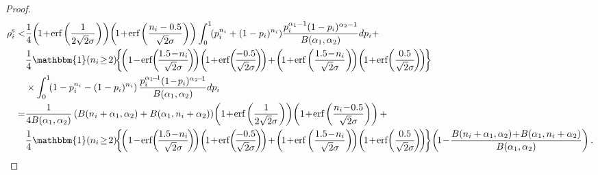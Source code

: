 \documentclass[10pt,journal,compsoc]{IEEEtran}
\begin{document}
\begin{proof}
\begin{align*}
\rho^{\text{s}}_i<&\frac{1}{4}\!\left(\!1\!+\!\mbox{erf}\left(\frac{1}{2\sqrt{2}\sigma}\right)\right)\!\left(\!1\!+\!\mbox{erf}\left(\frac{n_i-0.5}{\sqrt{2}\sigma}\right)\right)\int_{0}^{1}\!\!\left(p_i^{n_i}+(1-p_i)^{n_i}\right)\!\frac{p_i^{\alpha_1-1}(1-p_i)^{\alpha_2-1}}{B(\alpha_1,\alpha_2)}dp_i+\\
&\frac{1}{4}\mathbbm{1}(n_i\!\ge\!2)\!\bigg\{\!\!\left(1\!-\!\mbox{erf}\!\left(\!\frac{1.5\!-\!n_i}{\sqrt{2}\sigma}\!\right)\!\right)\!\left(\!1\!+\!\mbox{erf}\!\left(\!\frac{-0.5}{\sqrt{2}\sigma}\!\right)\!\right)\!+\!\left(\!1\!+\!\mbox{erf}\left(\frac{1.5\!-\!n_i}{\sqrt{2}\sigma}\right)\!\right)\!\left(\!1\!+\!\mbox{erf}\!\left(\frac{0.5}{\sqrt{2}\sigma}\!\right)\!\right)\!\!\bigg\}\\
&\times\int_0^1\!\!\left(1-p_i^{n_i}-(1-p_i)^{n_i}\right)\frac{p_i^{\alpha_1\!-\!1}(1\!-\!p_i)^{\alpha_2\!-\!1}}{B(\alpha_1,\alpha_2)}dp_i\!\\
=&\frac{1}{4B(\alpha_1,\alpha_2)}\left(B(n_i+\alpha_1,\alpha_2)+B(\alpha_1,n_i+\alpha_2)\right)\!\left(1\!+\!\mbox{erf}\left(\frac{1}{2\sqrt{2}\sigma}\right)\right)\!\left(1\!+\!\mbox{erf}\left(\frac{n_i\!-\!0.5}{\sqrt{2}\sigma}\right)\right)+\\
&\frac{1}{4}\mathbbm{1}(n_i\!\ge\!2)\!\bigg\{\!\!\left(1\!-\!\mbox{erf}\!\left(\!\frac{1.5\!-\!n_i}{\sqrt{2}\sigma}\!\right)\!\right)\!\left(\!1\!+\!\mbox{erf}\!\left(\!\frac{-0.5}{\sqrt{2}\sigma}\!\right)\!\right)\!+\!\left(\!1\!+\!\mbox{erf}\left(\frac{1.5\!-\!n_i}{\sqrt{2}\sigma}\right)\!\right)\!\left(\!1\!+\!\mbox{erf}\!\left(\frac{0.5}{\sqrt{2}\sigma}\!\right)\!\right)\!\!\bigg\}\!\left(\!1\!-\!\frac{B(n_i+\alpha_1,\alpha_2)\!+\!B(\alpha_1,n_i+\alpha_2)}{B(\alpha_1,\alpha_2)}\right).
\end{align*}
\normalsize


\end{proof}
\end{document}
